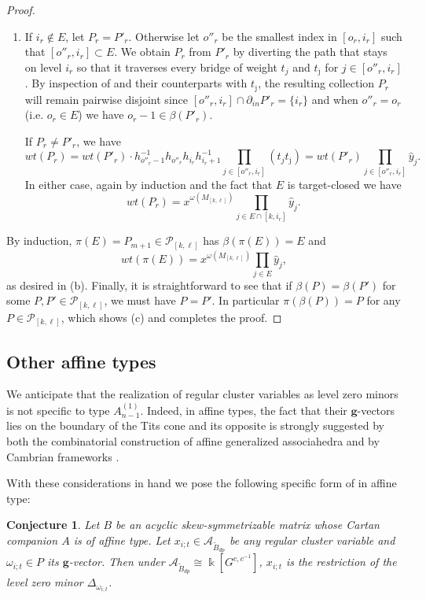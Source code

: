 \documentclass[12pt]{amsart}
\newcommand{\cA}{\mathcal{A}}
\newcommand{\kk}{\Bbbk}
\newcommand{\bfg}{\mathbf{g}}
\newcommand{\gv}{\omega}
\newcommand{\grep}{\gv}
\newcommand{\cP}{\mathcal{P}}
\newcommand{\ol}[1]{\overline{#1}}
\newcommand{\Bdp}{\widetilde{B}_{dp}}
\newcommand{\Qrep}{M}
\newtheorem{conjecture}[theorem]{Conjecture}
\theoremstyle{remark}
\numberwithin{equation}{section}
\numberwithin{figure}{section}
\begin{document}
\begin{proof}
\begin{enumerate}
    \item 
      If $i_r \notin E$, let $P_r = P'_r$.
      Otherwise let $o''_r$ be the smallest index in $[o_r,i_r]$ such that $[o''_r,i_r]\subset E$.
      We obtain $P_r$ from $P'_r$ by diverting the path that stays on level $i_r$ so that it traverses every bridge of weight $t_j$ and $t_{\ol{\jmath}}$ for $j\in[o''_r,i_r]$.
      By inspection of  and their counterparts with $t_{\ol{\jmath}}$, the resulting collection $P_r$ will remain pairwise disjoint since $[o''_r,i_r]\cap\partial_{in}P'_r=\{i_r\}$ and when $o''_r=o_r$ (i.e. $o_r\in E$) we have $o_r-1\in\beta(P'_r)$.
  
      If $P_r \neq P'_r$, we have 
      \[
        wt(P_r)=wt(P'_r)\cdot h_{o''_r-1}^{-1}h_{o''_r}h_{i_r}h_{i_r+1}^{-1}\prod_{j\in[o''_r,i_r]}(t_jt_{\ol{\jmath}})=wt(P'_r)\prod_{j \in [o''_r,i_r]} \hat{y}_j.
      \] 
      In either case, again by induction and the fact that $E$ is target-closed we have
      \[
        wt(P_r) = x^{\grep(\Qrep_{[k,\ell]})} \prod_{j \in E \cap [k,i_r]} \hat{y}_j.
      \]
  \end{enumerate}
  By induction, $\pi(E)=P_{m+1} \in \cP_{[k,\ell]}$ has $\beta(\pi(E))=E$ and 
  \[
    wt(\pi(E))=x^{\grep(\Qrep_{[k,\ell]})}\prod_{j\in E}\hat y_j,
  \]
  as desired in (b).
  Finally, it is straightforward to see that if $\beta(P) = \beta(P')$ for some $P, P' \in \cP_{[k,\ell]}$, we must have $P = P'$.
  In particular $\pi(\beta(P))=P$ for any $P\in\cP_{[k,\ell]}$, which shows (c) and completes the proof.
\end{proof}

\subsection{Other affine types}
\label{sec:othertypes}

We anticipate that the realization of regular cluster variables as level zero minors is not specific to type $A_{n-1}^{\!(1)}$.
Indeed, in affine types, the fact that their $\bfg$-vectors lies on the boundary of the Tits cone and its opposite is strongly suggested by both the combinatorial construction of affine generalized associahedra \cite{RS16} and by Cambrian frameworks \cite{RS15}.

With these considerations in hand we pose the following specific form of  in affine type:

\begin{conjecture}
  \label{conj:affine}
  Let $B$ be an acyclic skew-symmetrizable matrix whose Cartan companion $A$ is of affine type.
  Let $x_{i;t} \in \cA_{\Bdp}$ be any regular cluster variable and $\gv_{i;t} \in P$ its $\bfg$-vector.
  Then under $\cA_{\Bdp} \cong \kk[G^{c,c^{-1}}]$, $x_{i;t}$ is the restriction of the level zero minor $\Delta_{\gv_{i;t}}$.
\end{conjecture}
\end{document}
